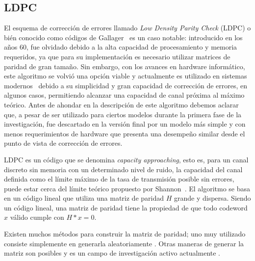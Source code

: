 \subsection{LDPC}
\label{defLDPC}
El esquema de corrección de errores llamado \textit{Low Density Parity Check} (LDPC) o bién conocido como códigos de Gallager~\cite{gallagerpress} es un caso notable: introducido en los años 60, fue olvidado debido a la alta capacidad de procesamiento y memoria requeridos, ya que para su implementación es necesario utilizar matrices de paridad de gran tamaño. Sin embargo, con los avances en hardware informático, este algoritmo se volvió una opción viable y actualmente es utilizado en sistemas modernos~\cite{brack2007low} debido a su simplicidad y gran capacidad de corrección de errores, en algunos casos, permitiendo alcanzar una capacidad de canal próxima al máximo teórico.
Antes de ahondar en la descripción de este algoritmo debemos aclarar que, a pesar de ser utilizado para ciertos modelos durante la primera fase de la investigación, fue descartado en la versión final por un modelo más simple y con menos requerimientos de hardware que presenta una desempeño similar desde el punto de vista de corrección de errores.

LDPC es un código que se denomina \textit{capacity approaching}, esto es, para un canal discreto sin memoria con un determinado nivel de ruido, la capacidad del canal definida como el límite máximo de la tasa de transmisión posible sin errores, puede estar cerca del límite teórico propuesto por Shannon~\cite{shannon48}.
El algoritmo se basa en un código lineal que utiliza una matriz de paridad $H$ grande y dispersa. Siendo un código lineal, una matriz de paridad tiene la propiedad de que todo codeword $x$ válido cumple con $H*x=0$. 

Existen muchos métodos para construir la matriz de paridad; uno muy utilizado consiste simplemente en generarla aleatoriamente \cite{gallagerpress}. Otras maneras de generar la matriz son posibles y es un campo de investigación activo actualmente \cite{thorpe2003low}.



